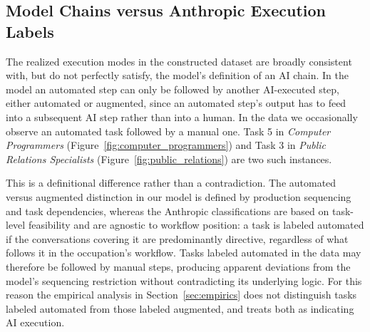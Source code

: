 \subsection{Model Chains versus Anthropic Execution Labels}
\label{app:data_prep.chain_labels}

The realized execution modes in the constructed dataset are broadly consistent with, but do not perfectly satisfy, the model's definition of an AI chain.
In the model an automated step can only be followed by another AI-executed step, either automated or augmented, since an automated step's output has to feed into a subsequent AI step rather than into a human.
In the data we occasionally observe an automated task followed by a manual one.
Task 5 in \textit{Computer Programmers} (Figure~\ref{fig:computer_programmers}) and Task 3 in \textit{Public Relations Specialists} (Figure~\ref{fig:public_relations}) are two such instances.

This is a definitional difference rather than a contradiction.
The automated versus augmented distinction in our model is defined by production sequencing and task dependencies, whereas the Anthropic classifications are based on task-level feasibility and are agnostic to workflow position: a task is labeled automated if the conversations covering it are predominantly directive, regardless of what follows it in the occupation's workflow.
Tasks labeled automated in the data may therefore be followed by manual steps, producing apparent deviations from the model's sequencing restriction without contradicting its underlying logic.
For this reason the empirical analysis in Section~\ref{sec:empirics} does not distinguish tasks labeled automated from those labeled augmented, and treats both as indicating AI execution.
